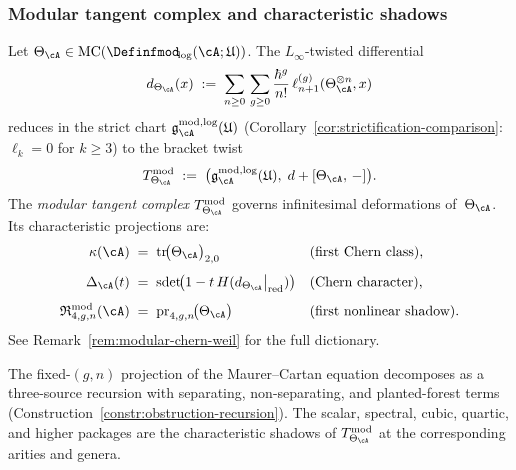 \subsubsection{Modular tangent complex and characteristic shadows}

\begin{construction}
\label{const:vol1-modular-tangent-complex}
Let $\Theta_\cA\in
\operatorname{MC}({\Definfmod}_{\!\log}(\cA;\mathfrak{U}))$.  The
$L_\infty$-twisted differential
\begin{equation}\label{eq:twisted-differential-theta}
d_{\Theta_\cA}(x)
\;:=\;
\sum_{n\ge 0}\,\sum_{g\ge 0}
\frac{\hbar^g}{n!}\,
\ell_{n+1}^{(g)}(\Theta_\cA^{\otimes n},x)
\end{equation}
reduces in the strict chart
$\mathfrak{g}^{\mathrm{mod},\log}_\cA(\mathfrak{U})$
(Corollary~\ref{cor:strictification-comparison}: $\ell_k=0$ for
$k\ge 3$) to the bracket twist
\begin{equation}\label{eq:modular-tangent-complex}
T^{\mathrm{mod}}_{\Theta_\cA}
\;:=\;
\bigl(
\mathfrak{g}^{\mathrm{mod},\log}_\cA(\mathfrak{U}),\;
d + [\Theta_\cA,\, -]
\bigr).
\end{equation}
The \emph{modular tangent complex}
$T^{\mathrm{mod}}_{\Theta_\cA}$ governs infinitesimal
deformations of~$\Theta_\cA$.  Its characteristic projections
are:
\begin{align}
\kappa(\cA)
&\;=\;
\operatorname{tr}\!
\bigl(\Theta_\cA\bigr)_{2,0}
&&\text{(first Chern class),}
\label{eq:kappa-chern-class}\\[4pt]
\Delta_\cA(t)
&\;=\;
\operatorname{sdet}\!\bigl(
1 - t\, H(d_{\Theta_\cA}\big|_{\mathrm{red}})
\bigr)
&&\text{(Chern character),}
\label{eq:delta-chern-character}\\[4pt]
\mathfrak{R}^{\mathrm{mod}}_{4,g,n}(\cA)
&\;=\;
\operatorname{pr}_{4,g,n}\!
\bigl(\Theta_\cA\bigr)
&&\text{(first nonlinear shadow).}
\label{eq:quartic-resonance-projection}
\end{align}
See Remark~\ref{rem:modular-chern-weil} for the full dictionary.
\end{construction}

\begin{remark}
\label{rem:vol1-genus-recursion-and-characteristic-shadows-pointer}
The fixed-$(g,n)$ projection of the Maurer--Cartan equation
decomposes as a three-source recursion with separating,
non-separating, and planted-forest terms
(Construction~\ref{constr:obstruction-recursion}).  The scalar,
spectral, cubic, quartic, and higher packages are the
characteristic shadows of $T^{\mathrm{mod}}_{\Theta_\cA}$
at the corresponding arities and genera.
\end{remark}

